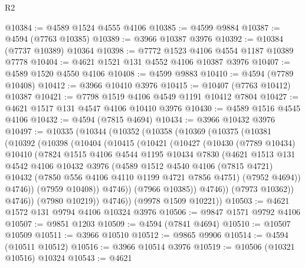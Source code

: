 \begin{lexlean}{R2}
\begin{coremodule}
@10384 := @4589 @1524 @4555 @4106
@10385 := @4599 @9884
@10387 := @4594 (@7763 @10385)
@10389 := @3966 @10387 @3976
@10392 := @10384 (@7737 @10389) @10364
@10398 := @7772 @1523 @4106 @4554 @1187 @10389 @7778
@10404 := @4621 @1521 @131 @4552 @4106 @10387 @3976
@10407 := @4589 @1520 @4550 @4106
@10408 := @4599 @9883
@10410 := @4594 (@7789 @10408)
@10412 := @3966 @10410 @3976
@10415 := @10407 (@7763 @10412) @10387
@10421 := @7798 @1519 @4106 @4549 @1191 @10412 @7804
@10427 := @4621 @1517 @131 @4547 @4106 @10410 @3976
@10430 := @4589 @1516 @4545 @4106
@10432 := @4594 (@7815 @4694)
@10434 := @3966 @10432 @3976
@10497 := @10335
    (@10344
      (@10352
        (@10358
          (@10369
            (@10375
              (@10381
                (@10392
                  (@10398
                    (@10404
                      (@10415
                        (@10421
                          (@10427
                            (@10430
                              (@7789 @10434)
                              @10410
                              (@7824
                                @1515
                                @4106
                                @4544
                                @1195
                                @10434
                                @7830
                                (@4621
                                  @1513
                                  @131
                                  @4542
                                  @4106
                                  @10432
                                  @3976
                                  (@4589
                                    @1512
                                    @4540
                                    @4106
                                    (@7815 @4721)
                                    @10432
                                    (@7850 @556 @4106 @4110 @1199 @4721 @7856 @4751)
                                    (@7952 @4694))
                                  @4746))
                              (@7959 @10408))
                            @4746))
                        (@7966 @10385))
                      @4746))
                  (@7973 @10362))
                @4746))
            (@7980 @10219))
          @4746))
      (@9978 @1509 @10221))
@10503 := @4621 @1572 @131 @9794 @4106 @10324 @3976
@10506 := @9847 @1571 @9792 @4106
@10507 := @9851 @1203
@10509 := @4594 (@7841 @4694)
@10510 := @10507 @10509
@10511 := @3966 @10510
@10512 := @9865 @9906
@10514 := @4594 (@10511 @10512)
@10516 := @3966 @10514 @3976
@10519 := @10506 (@10321 @10516) @10324
@10543 := @4621

\end{coremodule}
\end{lexlean}

